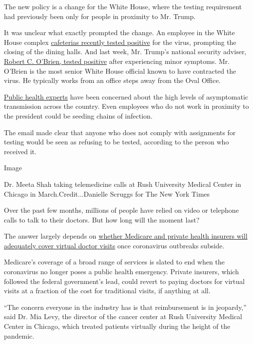 The new policy is a change for the White House, where the testing
requirement had previously been only for people in proximity to Mr.
Trump.

It was unclear what exactly prompted the change. An employee in the
White House complex
\href{https://www.nytimes3xbfgragh.onion/2020/07/22/us/politics/white-house-employee-covid-19.html}{cafeterias
recently tested positive} for the virus, prompting the closing of the
dining halls. And last week, Mr. Trump's national security adviser,
\href{https://www.nytimes3xbfgragh.onion/2020/07/27/us/politics/robert-obrien-virus.html}{Robert
C. O'Brien, tested positive} after experiencing minor symptoms. Mr.
O'Brien is the most senior White House official known to have contracted
the virus. He typically works from an office steps away from the Oval
Office.

\href{https://www.nytimes3xbfgragh.onion/2020/08/02/health/dr-birx-coronavirus-phase.html}{Public
health experts} have been concerned about the high levels of
asymptomatic transmission across the country. Even employees who do not
work in proximity to the president could be seeding chains of infection.

The email made clear that anyone who does not comply with assignments
for testing would be seen as refusing to be tested, according to the
person who received it.

Image

Dr. Meeta Shah taking telemedicine calls at Rush University Medical
Center in Chicago in March.Credit...Danielle Scruggs for The New York
Times

Over the past few months, millions of people have relied on video or
telephone calls to talk to their doctors. But how long will the moment
last?

The answer largely depends on
\href{https://www.nytimes3xbfgragh.onion/2020/08/03/health/covid-telemedicine-congress.html}{whether
Medicare and private health insurers will adequately cover virtual
doctor visits} once coronavirus outbreaks subside.

Medicare's coverage of a broad range of services is slated to end when
the coronavirus no longer poses a public health emergency. Private
insurers, which followed the federal government's lead, could revert to
paying doctors for virtual visits at a fraction of the cost for
traditional visits, if anything at all.

``The concern everyone in the industry has is that reimbursement is in
jeopardy,'' said Dr. Mia Levy, the director of the cancer center at Rush
University Medical Center in Chicago, which treated patients virtually
during the height of the pandemic.

